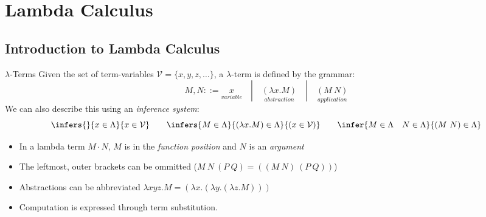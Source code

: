 \chapter{Lambda Calculus}

\section{Introduction to Lambda Calculus}
\begin{definitionbox}{$\lambda$-Terms}
	Given the set of term-variables $\mathcal{V} = \{x,y,z, \dots\}$, a $\lambda$-term is defined by the grammar:
	\[M, N ::= \underset{variable}{x} \quad | \quad \underset{abstraction}{(\lambda x . M)} \quad | \quad \underset{application}{(M \ N)}\]
	We can also describe this using an \textit{inference system}:
	\[\infers{}{x \in \Lambda}{x \in \mathcal{V}} \qquad \infers{M \in \Lambda}{(\lambda x . M) \in \Lambda}{(x \in \mathcal{V})} \qquad \infer{M \in \Lambda \quad N \in \Lambda}{(M \ N) \in \Lambda}\]
	\begin{itemize}
		\item In a lambda term $M \cdot N$, $M$ is in the \textit{function position} and $N$ is an \textit{argument}
		\item The leftmost, outer brackets can be ommitted ($M \ N \ (P \ Q) = ((M \ N) \ (P \ Q))$)
		\item Abstractions can be abbreviated $\lambda x y z . M = (\lambda x . (\lambda y . (\lambda z . M)))$
		\item Computation is expressed through term substitution.
	\end{itemize}
\end{definitionbox}

